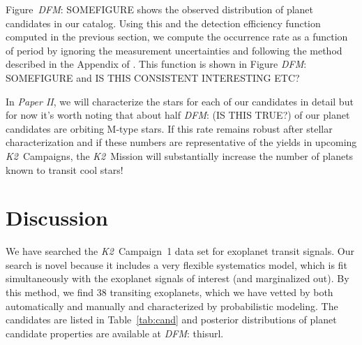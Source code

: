 \documentclass[12pt,preprint]{aastex}
\newcommand{\project}[1]{\textsl{#1}} %
\newcommand{\KT}{\project{K2}}
\newcommand{\papertwo}{\textsl{Paper II}}
\newcommand{\Tab}[1]{Table~\ref{tab:#1}}
\newcommand{\tab}[1]{\Tab{#1}}
\newcommand{\todo}[3]{{\color{#2}\emph{#1}: #3}}
\newcommand{\dfmtodo}[1]{\todo{DFM}{red}{#1}}
\begin{document}
Figure~\dfmtodo{SOMEFIGURE} shows the observed distribution of planet
candidates in our catalog.
Using this and the detection efficiency function computed in the previous
section, we compute the occurrence rate as a function of period by ignoring
the measurement uncertainties and following the method described in the
Appendix of \citet{dfm}.
This function is shown in Figure \dfmtodo{SOMEFIGURE and IS THIS CONSISTENT
INTERESTING ETC?}

In \papertwo, we will characterize the stars for each of our candidates in
detail but for now it's worth noting that about half \dfmtodo{(IS THIS TRUE?)} of our
planet candidates are orbiting M-type stars.
If this rate remains robust after stellar characterization and if these
numbers are representative of the yields in upcoming \KT\ Campaigns, the
\KT\ Mission
will substantially increase the number of planets known to transit cool stars!


\section{Discussion}

We have searched the \KT\ Campaign~1 data set for exoplanet transit signals.
Our search is novel because it includes a very flexible systematics model,
which is fit simultaneously with the exoplanet signals of interest (and
marginalized out).
By this method, we find 38 transiting exoplanets, which we have vetted by both
automatically and manually and characterized by probabilistic modeling.
The candidates are listed in \tab{cand} and posterior distributions of planet
candidate properties are available at \dfmtodo{thisurl}.
\end{document}
